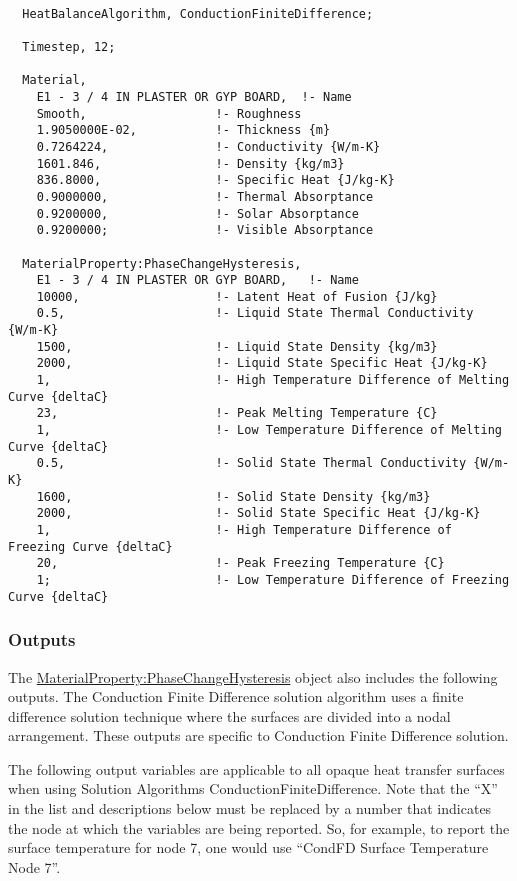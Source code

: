 \begin{lstlisting}

  HeatBalanceAlgorithm, ConductionFiniteDifference;

  Timestep, 12;

  Material,
    E1 - 3 / 4 IN PLASTER OR GYP BOARD,  !- Name
    Smooth,                  !- Roughness
    1.9050000E-02,           !- Thickness {m}
    0.7264224,               !- Conductivity {W/m-K}
    1601.846,                !- Density {kg/m3}
    836.8000,                !- Specific Heat {J/kg-K}
    0.9000000,               !- Thermal Absorptance
    0.9200000,               !- Solar Absorptance
    0.9200000;               !- Visible Absorptance

  MaterialProperty:PhaseChangeHysteresis,
    E1 - 3 / 4 IN PLASTER OR GYP BOARD,   !- Name
    10000,                   !- Latent Heat of Fusion {J/kg}
    0.5,                     !- Liquid State Thermal Conductivity {W/m-K}
    1500,                    !- Liquid State Density {kg/m3}
    2000,                    !- Liquid State Specific Heat {J/kg-K}
    1,                       !- High Temperature Difference of Melting Curve {deltaC}
    23,                      !- Peak Melting Temperature {C}
    1,                       !- Low Temperature Difference of Melting Curve {deltaC}
    0.5,                     !- Solid State Thermal Conductivity {W/m-K}
    1600,                    !- Solid State Density {kg/m3}
    2000,                    !- Solid State Specific Heat {J/kg-K}
    1,                       !- High Temperature Difference of Freezing Curve {deltaC}
    20,                      !- Peak Freezing Temperature {C}
    1;                       !- Low Temperature Difference of Freezing Curve {deltaC}

\end{lstlisting}

\subsubsection{Outputs}\label{materialpropertyphasechangehysteresis-outputs}

The \hyperref[materialpropertyphasechangehysteresis]{MaterialProperty:PhaseChangeHysteresis} object also includes the following outputs. The Conduction Finite Difference solution algorithm uses a finite difference solution technique where the surfaces are divided into a nodal arrangement. These outputs are specific to Conduction Finite Difference solution.

The following output variables are applicable to all opaque heat transfer surfaces when using Solution Algorithms ConductionFiniteDifference. Note that the ``X'' in the list and descriptions below must be replaced by a number that indicates the node at which the variables are being reported.  So, for example, to report the surface temperature for node 7, one would use ``CondFD Surface Temperature Node 7''.

